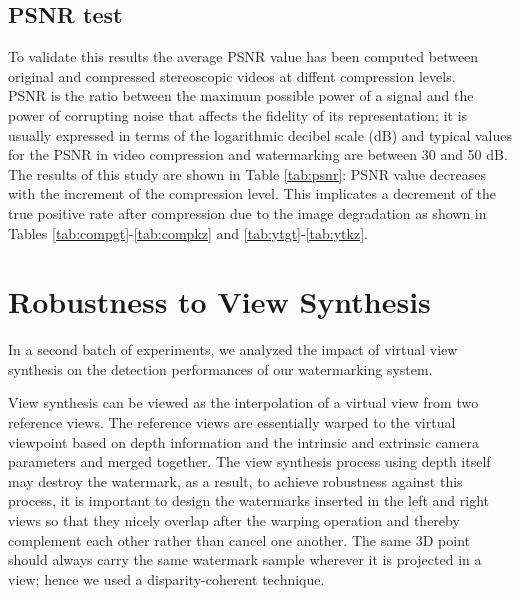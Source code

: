 \subsection{PSNR test}
To validate this results the average PSNR value has been computed between original and compressed  stereoscopic videos at diffent compression levels.\\
PSNR is the ratio between the maximum possible power of a signal and the power of corrupting noise that affects the fidelity of its representation; it is usually expressed in terms of the logarithmic decibel scale (dB) and typical values for the PSNR in video compression and watermarking are between 30 and 50 dB.
The results of this study are shown in Table \ref{tab:psnr}: PSNR value decreases with the increment of the compression level. This implicates a decrement of the true positive rate after compression due to the image degradation as shown in Tables \ref{tab:compgt}-\ref{tab:compkz} and \ref{tab:ytgt}-\ref{tab:ytkz}.\\
\begin{table}[htbp]
\begin{center}
\caption{\small{Average PSNR values between original video and compressed videos at different compression levels. The acronym YT stands for YouTube compression level, whose value is between 25 and 30 as the PSNR results show.} \label{tab:psnr}}
\end{center}
\end{table}

\section{Robustness to View Synthesis}
 
In a second batch of experiments, we analyzed the impact of virtual view synthesis on the detection performances of our watermarking system.

View synthesis can be viewed as the interpolation of a virtual view from two reference views. The reference views are essentially warped to the virtual viewpoint based on depth information and the intrinsic and extrinsic camera parameters and merged together.\newline
The view synthesis process using depth itself may destroy the watermark, as a result, to achieve robustness against this process, it is important to design the watermarks inserted in the left and right views so that they nicely overlap after the warping operation and thereby complement each other rather than cancel one another. The same 3D point should always carry the same watermark sample wherever it is projected in a view; hence we used a disparity-coherent technique.

